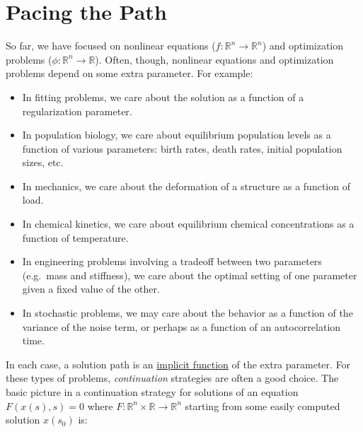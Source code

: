 \documentclass[12pt, leqno]{article} %
\providecommand{\tightlist}{%
  \setlength{\itemsep}{0pt}\setlength{\parskip}{0pt}}
\begin{document}

\section{Pacing the Path}

So far, we have focused on nonlinear equations
(\(f : {\mathbb{R}}^n \rightarrow {\mathbb{R}}^n\)) and optimization
problems (\(\phi : {\mathbb{R}}^n \rightarrow {\mathbb{R}}\)). Often,
though, nonlinear equations and optimization problems depend on some
extra parameter. For example:

\begin{itemize}
\tightlist
\item
  In fitting problems, we care about the solution as a function of a
  regularization parameter.
\item
  In population biology, we care about equilibrium population levels as
  a function of various parameters: birth rates, death rates, initial
  population sizes, etc.
\item
  In mechanics, we care about the deformation of a structure as a
  function of load.
\item
  In chemical kinetics, we care about equilibrium chemical
  concentrations as a function of temperature.
\item
  In engineering problems involving a tradeoff between two parameters
  (e.g.~mass and stiffness), we care about the optimal setting of one
  parameter given a fixed value of the other.
\item
  In stochastic problems, we may care about the behavior as a function
  of the variance of the noise term, or perhaps as a function of an
  autocorrelation time.
\end{itemize}

In each case, a solution path is an
\href{https://en.wikipedia.org/wiki/Implicit_function_theorem}{implicit
function} of the extra parameter. For these types of problems,
\emph{continuation} strategies are often a good choice. The basic
picture in a continuation strategy for solutions of an equation
\(F(x(s),s) = 0\) where
\(F : {\mathbb{R}}^n \times {\mathbb{R}}\rightarrow {\mathbb{R}}^n\)
starting from some easily computed solution \(x(s_0)\) is:
\end{document}
